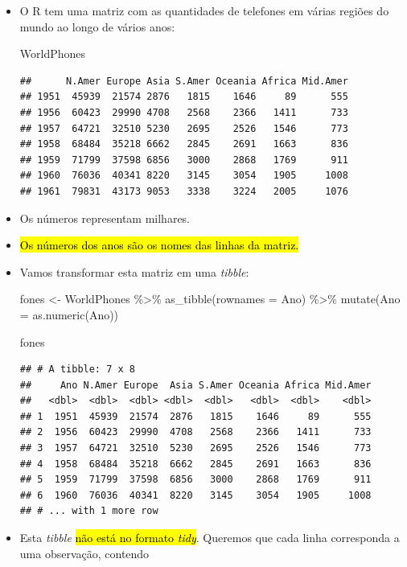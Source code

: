 \documentclass[
  11pt]{report}
\newenvironment{Shaded}{\begin{snugshade}}{\end{snugshade}}
\newcommand{\AttributeTok}[1]{\textcolor[rgb]{0.77,0.63,0.00}{#1}}
\newcommand{\FunctionTok}[1]{\textcolor[rgb]{0.00,0.00,0.00}{#1}}
\newcommand{\NormalTok}[1]{#1}
\newcommand{\OtherTok}[1]{\textcolor[rgb]{0.56,0.35,0.01}{#1}}
\newcommand{\SpecialCharTok}[1]{\textcolor[rgb]{0.00,0.00,0.00}{#1}}
\newcommand{\StringTok}[1]{\textcolor[rgb]{0.31,0.60,0.02}{#1}}
\renewenvironment{Shaded}{
    \begin{mdframed}[%
      roundcorner=2pt,%
      innerleftmargin=5pt,%
      innerrightmargin=5pt,%
      topline=true,%
      leftline=true,%
      rightline=true,%
      bottomline=true,%
      linewidth=0.5pt,%
      linecolor=black!20,%
      backgroundcolor=black!2,%
      skipabove=2ex,%
      skipbelow=2.5ex%
    ]%
  }
  {
    \end{mdframed}
  }
\begin{document}
\begin{itemize}
\item
  O R tem uma matriz com as quantidades de telefones em várias regiões do mundo ao longo de vários anos:

\begin{Shaded}
\begin{Highlighting}[]
\NormalTok{WorldPhones}
\end{Highlighting}
\end{Shaded}

\begin{verbatim}
##      N.Amer Europe Asia S.Amer Oceania Africa Mid.Amer
## 1951  45939  21574 2876   1815    1646     89      555
## 1956  60423  29990 4708   2568    2366   1411      733
## 1957  64721  32510 5230   2695    2526   1546      773
## 1958  68484  35218 6662   2845    2691   1663      836
## 1959  71799  37598 6856   3000    2868   1769      911
## 1960  76036  40341 8220   3145    3054   1905     1008
## 1961  79831  43173 9053   3338    3224   2005     1076
\end{verbatim}
\item
  Os números representam milhares.
\item
  {\hl{Os números dos anos são os nomes das linhas da matriz.}}
\item
  Vamos transformar esta matriz em uma \emph{tibble}:

\begin{Shaded}
\begin{Highlighting}[]
\NormalTok{fones }\OtherTok{\textless{}{-}}\NormalTok{ WorldPhones }\SpecialCharTok{\%\textgreater{}\%} 
  \FunctionTok{as\_tibble}\NormalTok{(}\AttributeTok{rownames =} \StringTok{\textquotesingle{}Ano\textquotesingle{}}\NormalTok{) }\SpecialCharTok{\%\textgreater{}\%} 
  \FunctionTok{mutate}\NormalTok{(}\AttributeTok{Ano =} \FunctionTok{as.numeric}\NormalTok{(Ano))}

\NormalTok{fones}
\end{Highlighting}
\end{Shaded}

\begin{verbatim}
## # A tibble: 7 x 8
##     Ano N.Amer Europe  Asia S.Amer Oceania Africa Mid.Amer
##   <dbl>  <dbl>  <dbl> <dbl>  <dbl>   <dbl>  <dbl>    <dbl>
## 1  1951  45939  21574  2876   1815    1646     89      555
## 2  1956  60423  29990  4708   2568    2366   1411      733
## 3  1957  64721  32510  5230   2695    2526   1546      773
## 4  1958  68484  35218  6662   2845    2691   1663      836
## 5  1959  71799  37598  6856   3000    2868   1769      911
## 6  1960  76036  40341  8220   3145    3054   1905     1008
## # ... with 1 more row
\end{verbatim}
\item
  Esta \emph{tibble} {\hl{não está no formato \emph{tidy}}}. Queremos que cada linha corresponda a uma observação, contendo


\end{itemize}
\end{document}
